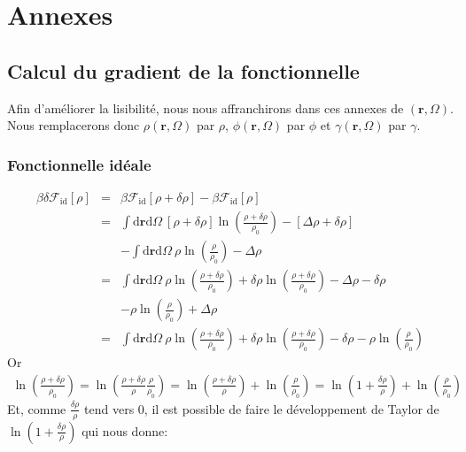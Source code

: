\appendix

\part*{Annexes}

\chapter{Calcul du gradient de la fonctionnelle}
Afin d'améliorer la lisibilité, nous nous affranchirons dans ces annexes de $(\boldsymbol{r},\Omega)$. Nous remplacerons donc $\rho(\boldsymbol{r},\Omega)$ par $\rho$, $\phi(\boldsymbol{r},\Omega)$ par $\phi$ et $\gamma(\boldsymbol{r},\Omega)$ par $\gamma$.
\label{chap:annexes:grad}

\section{Fonctionnelle idéale}
\label{sec:annexes:grad:id}
\begin{eqnarray}
\beta \delta \mathcal{F}_\mathrm{id}[\rho] &=& \beta \mathcal{F}_\mathrm{id}[\rho + \delta \rho] -\beta \mathcal{F}_\mathrm{id}[\rho] \\
&=& \int\mathrm{d}\boldsymbol{r}\mathrm{d}\Omega\ [\rho + \delta \rho]\ln(\frac{\rho + \delta \rho}{\rho_0})- [\Delta\rho + \delta \rho] \\
& & - \int\mathrm{d}\boldsymbol{r}\mathrm{d}\Omega\ \rho\ln(\frac{\rho}{\rho_0})-\Delta\rho \nonumber \\
&=& \int\mathrm{d}\boldsymbol{r}\mathrm{d}\Omega\ \rho \ln(\frac{\rho + \delta \rho}{\rho_0}) + \delta \rho\ln(\frac{\rho + \delta \rho}{\rho_0}) - \Delta\rho - \delta\rho \\
& & - \rho\ln(\frac{\rho}{\rho_0}) + \Delta\rho \nonumber \\
&=& \int\mathrm{d}\boldsymbol{r}\mathrm{d}\Omega\ \rho \ln(\frac{\rho + \delta \rho}{\rho_0}) + \delta \rho\ln(\frac{\rho + \delta \rho}{\rho_0}) - \delta\rho - \rho\ln(\frac{\rho}{\rho_0})\nonumber
\end{eqnarray}
Or
\begin{eqnarray}
\ln(\frac{\rho + \delta \rho}{\rho_0}) = \ln(\frac{\rho + \delta \rho}{\rho}\frac{\rho}{\rho_0}) = \ln(\frac{\rho + \delta \rho}{\rho})+\ln(\frac{\rho}{\rho_0}) = \ln(1+\frac{\delta \rho}{\rho})+\ln(\frac{\rho}{\rho_0})
\end{eqnarray}
Et, comme $\frac{\delta \rho}{\rho}$ tend vers 0, il est possible de faire le développement de Taylor de $\ln(1+\frac{\delta \rho}{\rho})$ qui nous donne:
